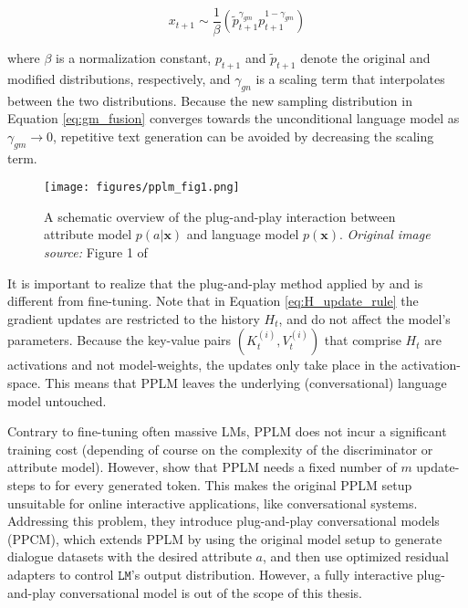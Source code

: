 \begin{equation}
    x_{t + 1} \sim \frac{1}{\beta}
    \left( 
    \tilde{p}_{t + 1}^{\gamma_{gm}} p_{t + 1}^{1 - \gamma_{gm}}
    \right)
    \label{eq:gm_fusion}
\end{equation}

where $\beta$ is a normalization constant, $p_{t + 1}$ and $\tilde{p}_{t + 1}$ denote the original and modified distributions, respectively, and $\gamma_{gn}$ is a scaling term that interpolates between the two distributions. Because the new sampling distribution in Equation \ref{eq:gm_fusion} converges towards the unconditional language model as $\gamma_{gm} \rightarrow 0$, repetitive text generation can be avoided by decreasing the scaling term.


\begin{figure}[H]
    \centering
    \texttt{[image: figures/pplm\_fig1.png]}
    \caption{A schematic overview of the plug-and-play interaction between attribute model $p(a | \textbf{x})$ and language model $p(\textbf{x})$. \textit{Original image source:} Figure 1 of \cite{dathathri2019plug}}
    \label{fig:pplm_schematic_overview}
\end{figure}



It is important to realize that the plug-and-play method applied by \cite{dathathri2019plug} and \cite{madotto-etal-2020-plug} is different from fine-tuning. Note that in Equation \ref{eq:H_update_rule} the gradient updates are restricted to the history $H_t$, and do not affect the model's parameters. Because the key-value pairs $(K_t^{(i)}, V_t^{(i)})$ that comprise $H_t$ are activations and not model-weights, the updates only take place in the activation-space. This means that PPLM leaves the underlying (conversational) language model untouched.

Contrary to fine-tuning often massive LMs, PPLM does not incur a significant training cost (depending of course on the complexity of the discriminator or attribute model). However, \cite{madotto-etal-2020-plug} show that PPLM needs a fixed number of $m$ update-steps to for every generated token. This makes the original PPLM setup unsuitable for online interactive applications, like conversational systems. Addressing this problem, they introduce plug-and-play conversational models (PPCM), which extends PPLM by using the original model setup to generate dialogue datasets with the desired attribute $a$, and then use optimized residual adapters \citep{bapna-firat-2019-simple} to control $\texttt{LM}$'s output distribution. However, a fully interactive plug-and-play conversational model is out of the scope of this thesis.

